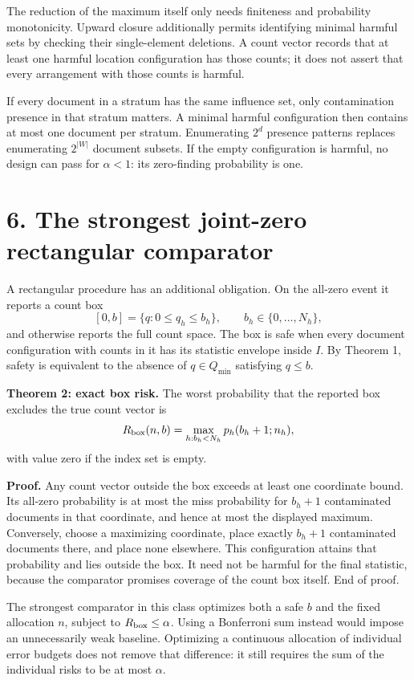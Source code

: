\documentclass[11pt]{article}
\begin{document}
The reduction of the maximum itself only needs finiteness and probability monotonicity. Upward closure additionally permits identifying minimal harmful sets by checking their single-element deletions. A count vector records that at least one harmful location configuration has those counts; it does not assert that every arrangement with those counts is harmful.

If every document in a stratum has the same influence set, only contamination presence in that stratum matters. A minimal harmful configuration then contains at most one document per stratum. Enumerating $2^d$ presence patterns replaces enumerating $2^{|W|}$ document subsets. If the empty configuration is harmful, no design can pass for $\alpha<1$: its zero-finding probability is one.

\section*{6. The strongest joint-zero rectangular comparator}

A rectangular procedure has an additional obligation. On the all-zero event it reports a count box
\[
[0,b]=\{q:0\le q_h\le b_h\},\qquad b_h\in\{0,\ldots,N_h\},
\]
and otherwise reports the full count space. The box is safe when every document configuration with counts in it has its statistic envelope inside $I$. By Theorem 1, safety is equivalent to the absence of $q\in Q_{\min}$ satisfying $q\le b$.

\textbf{Theorem 2: exact box risk.} The worst probability that the reported box excludes the true count vector is
\[
R_{\rm box}(n,b)=\max_{h:b_h<N_h}p_h(b_h+1;n_h),
\]
with value zero if the index set is empty.

\textbf{Proof.} Any count vector outside the box exceeds at least one coordinate bound. Its all-zero probability is at most the miss probability for $b_h+1$ contaminated documents in that coordinate, and hence at most the displayed maximum. Conversely, choose a maximizing coordinate, place exactly $b_h+1$ contaminated documents there, and place none elsewhere. This configuration attains that probability and lies outside the box. It need not be harmful for the final statistic, because the comparator promises coverage of the count box itself. End of proof.

The strongest comparator in this class optimizes both a safe $b$ and the fixed allocation $n$, subject to $R_{\rm box}\le\alpha$. Using a Bonferroni sum instead would impose an unnecessarily weak baseline. Optimizing a continuous allocation of individual error budgets does not remove that difference: it still requires the sum of the individual risks to be at most $\alpha$.
\end{document}
